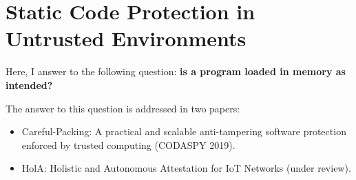 \chapter{Static Code Protection in Untrusted Environments}
\label{chp:static-protection} 

Here, I answer to the following question: \textbf{is a program loaded in memory 
as intended?}

The answer to this question is addressed in two papers:
\begin{itemize}
	\item Careful-Packing: A practical and scalable anti-tampering software 
	protection enforced by trusted computing (CODASPY 2019).
	\item HolA: Holistic and Autonomous Attestation for IoT Networks (under 
	review).
\end{itemize}